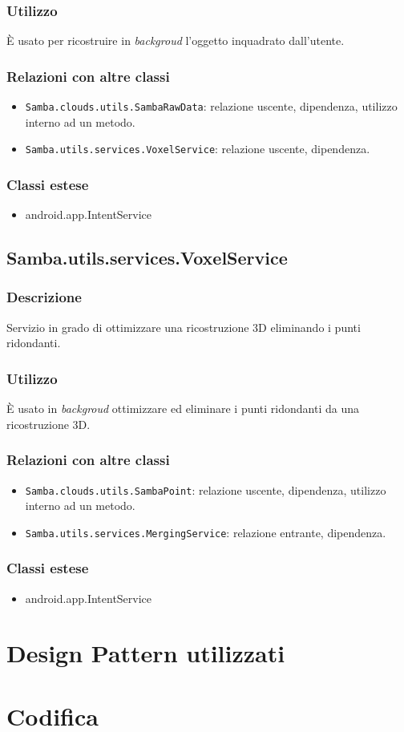 \subsubsection{Utilizzo}
È usato per ricostruire in \emph{backgroud} l'oggetto inquadrato dall'utente.
\subsubsection{Relazioni con altre classi}
\begin{itemize}
	\item \texttt{Samba.clouds.utils.SambaRawData}: relazione uscente, dipendenza, utilizzo interno ad un metodo.
	\item \texttt{Samba.utils.services.VoxelService}: relazione uscente, dipendenza.
\end{itemize}
\subsubsection{Classi estese}
\begin{itemize}
	\item android.app.IntentService
\end{itemize}

\subsection{Samba.utils.services.VoxelService}
\subsubsection{Descrizione}
Servizio in grado di ottimizzare una ricostruzione 3D eliminando i punti ridondanti.
\subsubsection{Utilizzo}
È usato in \emph{backgroud} ottimizzare ed eliminare i punti ridondanti da una ricostruzione 3D.
\subsubsection{Relazioni con altre classi}
\begin{itemize}
	\item \texttt{Samba.clouds.utils.SambaPoint}: relazione uscente, dipendenza, utilizzo interno ad un metodo.
	\item \texttt{Samba.utils.services.MergingService}: relazione entrante, dipendenza.
\end{itemize}
\subsubsection{Classi estese}
\begin{itemize}
	\item android.app.IntentService
\end{itemize}


\section{Design Pattern utilizzati}

\section{Codifica}
